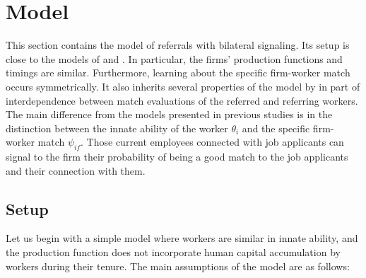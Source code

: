 \documentclass[12pt]{article}
\begin{document}
\section{Model} \label{sec:model}
This section contains the model of referrals with bilateral signaling. Its setup is close to the models of \cite{waldman1984job} and \cite{gibbons1999theory, gibbons2006enriching}. In particular, the firms' production functions and timings are similar. Furthermore, learning about the specific firm-worker match occurs symmetrically. It also inherits several properties of the model by \cite{ekinci2016employee} in part of interdependence between match evaluations of the referred and referring workers.  The main difference from the models presented in previous studies is in the distinction between the innate ability of the worker $\theta_i$ and the specific firm-worker match $\psi_{if}$. Those current employees connected with job applicants can signal to the firm their probability of being a good match to the job applicants and their connection with them.

\subsection{Setup}
Let us begin with a simple model where workers are similar in innate ability, and the production function does not incorporate human capital accumulation by workers during their tenure. The main assumptions of the model are as follows:
\end{document}
